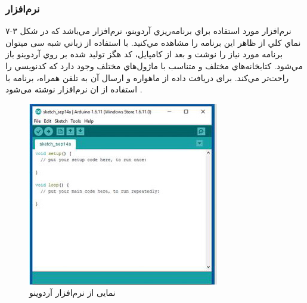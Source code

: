\subsubsection{نرم‌افزار }
نرم‌افزار مورد استفاده براي برنامه‌ريزي آردوينو، نرم‌افزار   مي‌باشد كه در شکل ۳-۷ نماي كلي از ظاهر اين برنامه را مشاهده مي‌كنيد. با استفاده از زباني شبه سی ميتوان برنامه مورد نياز را نوشت و بعد از كامپايل، كد هگز توليد شده بر روي آردوينو باز مي‌شود. كتابخانه‌هاي مختلف و متناسب با ماژول‌هاي مختلف وجود دارد كه كدنويسي را راحت‌تر مي‌كند. برای دریافت داده از ماهواره و ارسال آن به تلفن همراه، برنامه با استفاده از ان نرم‌افزار نوشته می‌شود \cite{Rahman2016}. 
\begin{figure}[!h]
	\centerline{\includegraphics[width=.5\textwidth]{arduino-ide}}
	\caption{نمایی از نرم‌افزار آردوینو}
\end{figure}
